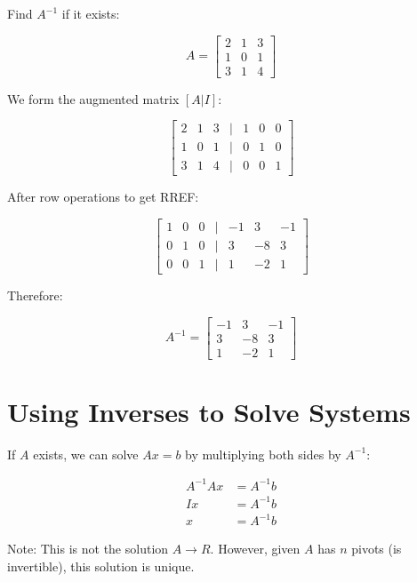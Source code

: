 \documentclass[12pt,a4paper]{article}
\begin{document}
Find $A^{-1}$ if it exists:

\[ A = \begin{bmatrix} 2 & 1 & 3 \\ 1 & 0 & 1 \\ 3 & 1 & 4 \end{bmatrix} \]

We form the augmented matrix $[A|I]$:

\[ \begin{bmatrix} 
2 & 1 & 3 & | & 1 & 0 & 0 \\
1 & 0 & 1 & | & 0 & 1 & 0 \\
3 & 1 & 4 & | & 0 & 0 & 1
\end{bmatrix} \]

After row operations to get RREF:

\[ \begin{bmatrix} 
1 & 0 & 0 & | & -1 & 3 & -1 \\
0 & 1 & 0 & | & 3 & -8 & 3 \\
0 & 0 & 1 & | & 1 & -2 & 1
\end{bmatrix} \]

Therefore:

\[ A^{-1} = \begin{bmatrix} -1 & 3 & -1 \\ 3 & -8 & 3 \\ 1 & -2 & 1 \end{bmatrix} \]

\section{Using Inverses to Solve Systems}

If $A$ exists, we can solve $Ax = b$ by multiplying both sides by $A^{-1}$:

\begin{align*}
A^{-1}Ax &= A^{-1}b \\
Ix &= A^{-1}b \\
x &= A^{-1}b
\end{align*}

Note: This is not the solution $A \rightarrow R$. However, given $A$ has $n$ pivots (is invertible), this solution is unique.
\end{document}
